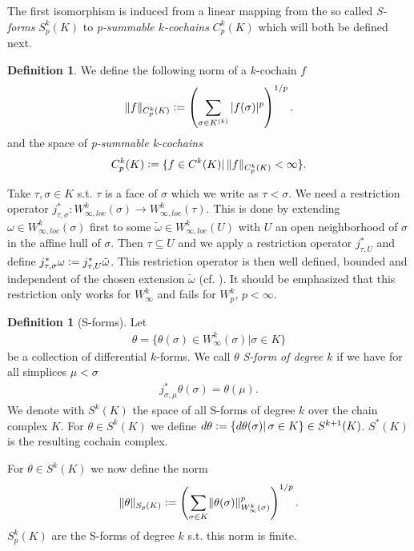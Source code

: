 \documentclass[12pt,a4paper]{article}
\numberwithin{equation}{subsection}
\numberwithin{lemma}{subsection}
\theoremstyle{definition}
\newtheorem{definition}[lemma]{Definition}
\newcommand{\norm}[2]{\lVert #1 \rVert_{#2}}
\begin{document}
The first isomorphism is induced from a linear mapping
from the so called \textit{S-forms} 
$S_p^k(K)$ to 
\textit{p-summable $k$-cochains} $C_p^k(K)$ which will both 
be defined next.

\begin{definition}
    We define the following norm of a $k$-cochain $f$
    \begin{align*}
        \norm{f}{C_p^k(K)} \vcentcolon= 
        \left( \sum\limits_{\sigma \in K^{(k)}} |f(\sigma)|^p \right)^{1/p}.
    \end{align*} %
    and the space of \textit{p-summable k-cochains}
    \begin{align*}
    C_p^k(K) \vcentcolon= \{f \in C^k(K) | \,  
    \norm{f}{C_p^k(K)} < \infty \}.
    \end{align*}
\end{definition}
Take $\tau, \sigma \in K$ s.t. $\tau$ is a face of $\sigma$ which we write as
$\tau < \sigma$. We need a restriction operator 
$j^*_{\tau,\sigma}:W_{\infty,loc}^k(\sigma) \rightarrow W_{\infty,loc}^k(\tau)$.
This is done by extending $\omega \in W_{\infty,loc}^k(\sigma)$ first 
to some $\tilde{\omega}\in W_{\infty,loc}^k(U)$ with 
$U$ an open neighborhood of $\sigma$ in the affine hull of $\sigma$. Then 
$\tau \subseteq U$ and we apply a restriction operator $j^*_{\tau,U}$
and define $j^*_{\tau,\sigma} \omega \vcentcolon= j^*_{\tau,U}\tilde{\omega}$. 
This restriction operator is then well defined, 
bounded and independent of the chosen 
extension $\tilde{\omega}$ (cf. \cite[p.191]{goldshtein}). It should be 
emphasized that this restriction only works for $W^k_\infty$ and fails for 
$W^k_p$, $p<\infty$. 

\begin{definition}[S-forms]
    Let 
    \begin{align*}
    \theta = \{ \theta(\sigma) \in W^k_\infty(\sigma) | \sigma \in K\}
    \end{align*}
    be a collection of differential $k$-forms. We call $\theta$ \textit{S-form 
    of degree
    $k$} if we have for all simplices
    $\mu <\sigma$ 
    \begin{align*}
    j^*_{\sigma,\mu}\theta(\sigma) = \theta(\mu).
    \end{align*}
    We denote with $S^k(K)$ the space of all S-forms of degree $k$ 
    over the chain complex $K$. 
    For $\theta \in S^k(K)$ we define $d\theta \vcentcolon= \{ d\theta(\sigma) | 
    \,\sigma \in K \} \in S^{k+1}(K)$. $S^*(K)$ is the resulting cochain complex.
\end{definition}
For $\theta \in S^k(K)$ we now define the norm
\begin{align*}
\lVert \theta \rVert _{S_p(K)}  \vcentcolon= \left( \sum_{\sigma \in K} 
\lVert \theta(\sigma) \rVert _{W^k_\infty(\sigma)}^p \right)^{1/p}.
\end{align*} 
$S^k_p(K)$ are the S-forms of degree $k$ s.t. this norm is finite.
\end{document}
